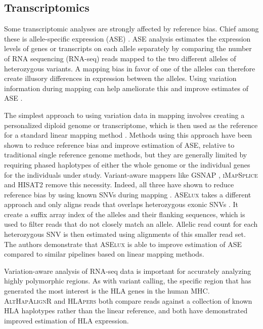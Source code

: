 \subsection{Transcriptomics}
\label{sec:transcriptomics}

Some transcriptomic analyses are strongly affected by reference bias.
Chief among these is allele-specific expression (ASE) \cite{Degner2009-vw,stevenson2013sources,Castel2015-ef}.
ASE analysis estimates the expression levels of genes or transcripts on each allele separately by comparing the number of RNA sequencing (RNA-seq) reads mapped to the two different alleles of heterozygous variants.
A mapping bias in favor of one of the alleles can therefore create illusory differences in expression between the alleles.
Using variation information during mapping can help ameliorate this and improve estimates of ASE \cite{Castel2015-ef,Miao2018-ps}.

The simplest approach to using variation data in mapping involves creating a personalized diploid genome or transcriptome, which is then used as the reference for a standard linear mapping method \cite{Rozowsky_2011,Raghupathy2018-sd}.
Methods using this approach have been shown to reduce reference bias and improve estimation of ASE, relative to traditional single reference genome methods, but they are generally limited by requiring phased haplotypes of either the whole genome or the individual genes for the individuals under study.
Variant-aware mappers like \textsc{GSNAP} \cite{Wu2010-hv}, \textsc{iMapSplice} \cite{Liu_2018} and \textsc{HISAT2} \cite{Kim_2019} remove this necessity.
Indeed, all three have shown to reduce reference bias by using known SNVs during mapping \cite{Castel2015-ef,Liu_2018}.
\textsc{ASElux} takes a different approach and only aligns reads that overlaps heterozygous exonic SNVs \cite{Miao2018-ps}.
It create a suffix array index of the alleles and their flanking sequences, which is used to filter reads that do not closely match an allele.
Allelic read count for each heterozygous SNV is then estimated using alignments of this smaller read set.
The authors demonstrate that \textsc{ASElux} is able to improve estimation of ASE compared to similar pipelines based on linear mapping methods.

Variation-aware analysis of RNA-seq data is important for accurately analyzing highly polymorphic regions.
As with variant calling, the specific region that has generated the most interest is the HLA genes in the human MHC. 
\textsc{AltHapAlignR} \cite{Lee_2018} and \textsc{HLApers} \cite{Aguiar2019-fy} both compare reads against a collection of known HLA haplotypes rather than the linear reference, and both have demonstrated improved estimation of HLA expression.

